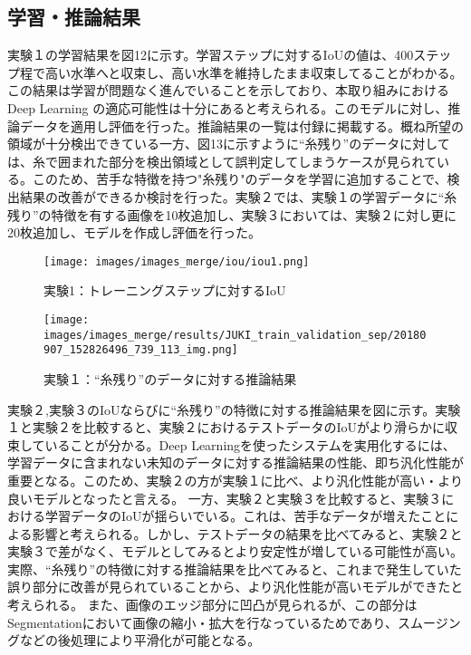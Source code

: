 \subsection{学習・推論結果}

実験１の学習結果を図12に示す。学習ステップに対するIoUの値は、400ステップ程で高い水準へと収束し、高い水準を維持したまま収束してることがわかる。この結果は学習が問題なく進んでいることを示しており、本取り組みにおけるDeep Learning の適応可能性は十分にあると考えられる。このモデルに対し、推論データを適用し評価を行った。推論結果の一覧は付録に掲載する。概ね所望の領域が十分検出できている一方、図13に示すように“糸残り”のデータに対しては、糸で囲まれた部分を検出領域として誤判定してしまうケースが見られている。このため、苦手な特徴を持つ"糸残り"のデータを学習に追加することで、検出結果の改善ができるか検討を行った。実験２では、実験１の学習データに“糸残り”の特徴を有する画像を10枚追加し、実験３においては、実験２に対し更に20枚追加し、モデルを作成し評価を行った。

\begin{figure}[htbp]
\begin{minipage}{0.5\hsize}
\begin{center}
\texttt{[image: images/images\_merge/iou/iou1.png]}
\end{center}
\caption{実験1：トレーニングステップに対するIoU}
\label{fig:iou1}
\end{minipage}
\begin{minipage}{0.5\hsize}
\begin{center}
\texttt{[image: images/images\_merge/results/JUKI\_train\_validation\_sep/20180907\_152826496\_739\_113\_img.png]}
\end{center}
\caption{実験１：“糸残り”のデータに対する推論結果}
\label{fig:nokori1}
\end{minipage}
\end{figure} 

実験２,実験３のIoUならびに“糸残り”の特徴に対する推論結果を図に示す。実験１と実験２を比較すると、実験２におけるテストデータのIoUがより滑らかに収束していることが分かる。Deep Learningを使ったシステムを実用化するには、学習データに含まれない未知のデータに対する推論結果の性能、即ち汎化性能が重要となる。このため、実験２の方が実験１に比べ、より汎化性能が高い・より良いモデルとなったと言える。
一方、実験２と実験３を比較すると、実験３における学習データのIoUが揺らいでいる。これは、苦手なデータが増えたことによる影響と考えられる。しかし、テストデータの結果を比べてみると、実験２と実験３で差がなく、モデルとしてみるとより安定性が増している可能性が高い。実際、“糸残り”の特徴に対する推論結果を比べてみると、これまで発生していた誤り部分に改善が見られていることから、より汎化性能が高いモデルができたと考えられる。
また、画像のエッジ部分に凹凸が見られるが、この部分はSegmentationにおいて画像の縮小・拡大を行なっているためであり、スムージングなどの後処理により平滑化が可能となる。

